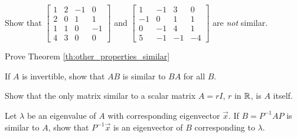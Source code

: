 \documentclass{ximera}
\begin{document}





\begin{problem}\label{prob:notsimilar_4x4}
Show that $\begin{bmatrix}
1 & 2 & -1 &  0 \\
2 & 0 &  1 &  1 \\
1 & 1 &  0 & -1 \\
4 & 3 & 0 & 0
\end{bmatrix}$ and $
\begin{bmatrix}
  1 & -1 &  3 &  0 \\
 -1 &  0 &  1 &  1 \\
  0 & -1 &  4 &  1 \\
  5 & -1 & -1 & -4
\end{bmatrix}$ are \textit{not} similar.
\end{problem}

\begin{problem}\label{prob:similarproperties}
Prove Theorem \ref{th:other_properties_similar}
\end{problem}

\begin{problem}\label{prob:similarproperties_invertible}
If $A$ is invertible, show that $AB$ is similar to $BA$ for all $B$.
\end{problem}

\begin{problem}\label{prob:similarproperties_rI}
Show that the only matrix similar to a scalar matrix $A = rI$, $r$ in $\mathbb{R}$, is $A$ itself.
\end{problem}

\begin{problem}\label{prob:similarproperties_ev}
Let $\lambda$ be an eigenvalue of $A$ with corresponding eigenvector $\vec{x}$. If $B = P^{-1}AP$ is similar to $A$, show that $P^{-1}\vec{x}$ is an eigenvector of $B$ corresponding to $\lambda$.
\end{problem}
\end{document}

